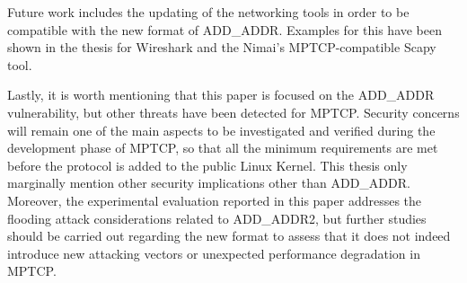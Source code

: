 Future work includes the updating of the networking tools in order to be compatible with the new format of ADD\_ADDR. Examples for this have been shown in the thesis for Wireshark and the Nimai's MPTCP-compatible Scapy tool.

Lastly, it is worth mentioning that this paper is focused on the ADD\_ADDR vulnerability, but other threats have been detected for MPTCP. Security concerns will remain one of the main aspects to be investigated and verified during the development phase of MPTCP, so that all the minimum requirements are met before the protocol is added to the public Linux Kernel. This thesis only marginally mention other security implications other than ADD\_ADDR. Moreover, the experimental evaluation reported in this paper addresses the flooding attack considerations related to ADD\_ADDR2, but further studies should be carried out regarding the new format to assess that it does not indeed introduce new attacking vectors or unexpected performance degradation in MPTCP.